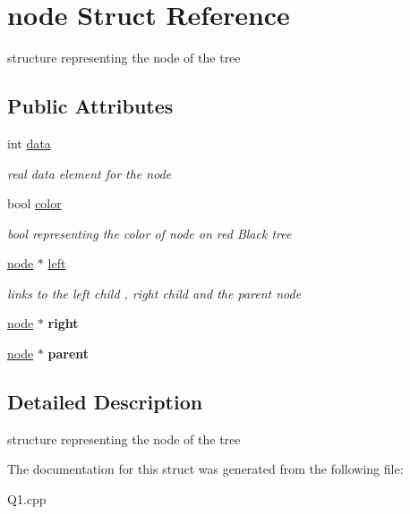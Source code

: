 \hypertarget{structnode}{}\section{node Struct Reference}
\label{structnode}


structure representing the node of the tree  


\subsection*{Public Attributes}
\begin{DoxyCompactItemize}
\item 
\mbox{\label{structnode_a2d890bb9f6af0ffd73fe79b21124c2a2}} 
int \hyperlink{structnode_a2d890bb9f6af0ffd73fe79b21124c2a2}{data}
\begin{DoxyCompactList}\small\item\em real data element for the node \end{DoxyCompactList}\item 
\mbox{\label{structnode_ad3d475f22776899938bbca39b65f2414}} 
bool \hyperlink{structnode_ad3d475f22776899938bbca39b65f2414}{color}
\begin{DoxyCompactList}\small\item\em bool representing the color of node on red Black tree \end{DoxyCompactList}\item 
\mbox{\label{structnode_a7cbff55ff448f557223f79299056e9b1}} 
\hyperlink{structnode}{node} $\ast$ \hyperlink{structnode_a7cbff55ff448f557223f79299056e9b1}{left}
\begin{DoxyCompactList}\small\item\em links to the left child , right child and the parent node \end{DoxyCompactList}\item 
\mbox{\label{structnode_afafc72df7ea24f355ad3abb32a331689}} 
\hyperlink{structnode}{node} $\ast$ {\bfseries right}
\item 
\mbox{\label{structnode_a2d2ad84813baa5e30cb01c8a44dde540}} 
\hyperlink{structnode}{node} $\ast$ {\bfseries parent}
\end{DoxyCompactItemize}


\subsection{Detailed Description}
structure representing the node of the tree 

The documentation for this struct was generated from the following file\+:\begin{DoxyCompactItemize}
\item 
Q1.\+cpp\end{DoxyCompactItemize}
